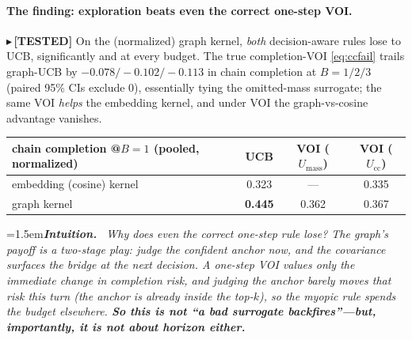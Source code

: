 \documentclass[11pt]{article}
\newcommand{\TESTED}[1]{{\color{teal}\small$\blacktriangleright$\,\textbf{[TESTED]} #1}}
\newenvironment{intuition}{\par\smallskip\noindent\hangindent=1.5em\textbf{\itshape Intuition.}\itshape\ \ignorespaces}{\par\smallskip}
\begin{document}
\paragraph{The finding: exploration beats even the correct one-step VOI.}
\TESTED{On the (normalized) graph kernel, \emph{both} decision-aware rules lose to UCB, significantly and at
every budget. The true completion-VOI \eqref{eq:ccfail} trails graph-UCB by $-0.078/-0.102/-0.113$ in chain
completion at $B{=}1/2/3$ (paired 95\% CIs exclude 0), essentially tying the omitted-mass surrogate; the same
VOI \emph{helps} the embedding kernel, and under VOI the graph-vs-cosine advantage vanishes.}
\begin{center}\small
\begin{tabular}{lccc}
\toprule
chain completion @$B{=}1$ (pooled, normalized) & UCB & VOI ($U_{\text{mass}}$) & VOI ($U_{\text{cc}}$) \\ \midrule
embedding (cosine) kernel & 0.323 & --- & 0.335 \\
graph kernel  & \textbf{0.445} & 0.362 & 0.367 \\ \bottomrule
\end{tabular}
\end{center}
\begin{intuition}
Why does even the \emph{correct} one-step rule lose? The graph's payoff is a \emph{two-stage} play: judge the
confident \emph{anchor} now, and the covariance surfaces the \emph{bridge} at the \emph{next} decision. A
one-step VOI values only the immediate change in completion risk, and judging the anchor barely moves that risk
this turn (the anchor is already inside the top-$k$), so the myopic rule spends the budget elsewhere. \textbf{So
this is not ``a bad surrogate backfires''---but, importantly, it is \emph{not} about horizon either.}
\end{intuition}
\end{document}
